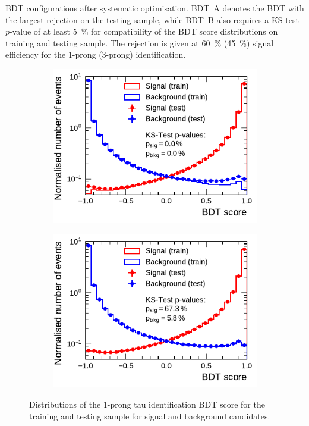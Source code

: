 \begin{table}[htb]
  \centering
  {\small}
  \caption[Optimised BDT configurations]{BDT configurations after systematic
    optimisation. BDT~A denotes the BDT with the largest rejection on the
    testing sample, while BDT~B also requires a KS test $p$-value of at least
    \SI{5}{\percent} for compatibility of the BDT score distributions on
    training and testing sample. The rejection is given at \SI{60}{\percent}
    (\SI{45}{\percent}) signal efficiency for the 1-prong (3-prong)
    identification.}
  \label{tab:bdt_perfs}
\end{table}

\begin{figure}[htb]
  \begin{subfigure}[t]{0.48\textwidth}
    \centering
    \includegraphics{./figures/bdt_perf/scores/grid_1p0304.pdf}
    \label{fig:bdt_score_1p}
  \end{subfigure}\hfill
  \begin{subfigure}[t]{0.48\textwidth}
    \centering
    \includegraphics{./figures/bdt_perf/scores/grid_1p_subsampling0269.pdf}
    \label{fig:bdt_score_1p_ks5}
  \end{subfigure}
  \caption[Distribution of the tau identification BDT score
  (1-prong)]{Distributions of the 1-prong tau identification BDT score for the
    training and testing sample for signal and background candidates.}
  \label{fig:bdt_overfitting_scores}
\end{figure}

